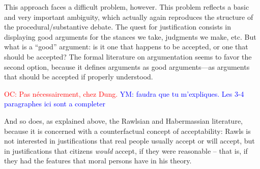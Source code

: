\documentclass[preprint, french, english, 11pt]{elsarticle}%
\newcommand{\commentYM}[1]{\textcolor{blue}{YM: #1}}
\newcommand{\commentOC}[1]{\textcolor{red}{OC: #1}}
\begin{document}
This approach faces a difficult problem, however. This problem reflects a basic and very important ambiguity, which actually again reproduces the structure of the procedural/substantive debate. The quest for justification consists in displaying good arguments for the stances we take, judgments we make, etc. But what is a ``good'' argument: is it one that happens to be accepted, or one that should be accepted?
The formal literature on argumentation \cite{dung_acceptability_1995,besnard_elements_2008} seems to favor the second option, because it defines arguments as good arguments—as arguments that should be accepted if properly understood. 

\commentOC{Pas nécessairement, chez Dung.}
\commentYM{faudra que tu m'expliques. Les 3-4 paragraphes ici sont a completer}

And so does, as explained above, the Rawlsian and Habermassian literature, because it is concerned with a counterfactual concept of acceptability: Rawls is not interested in justifications that real people usually accept or will accept, but in justifications that citizens \emph{would} accept, if they were reasonable -- that is, if they had the features that moral persons have in his theory. %


 
 
 
 
\end{document}
